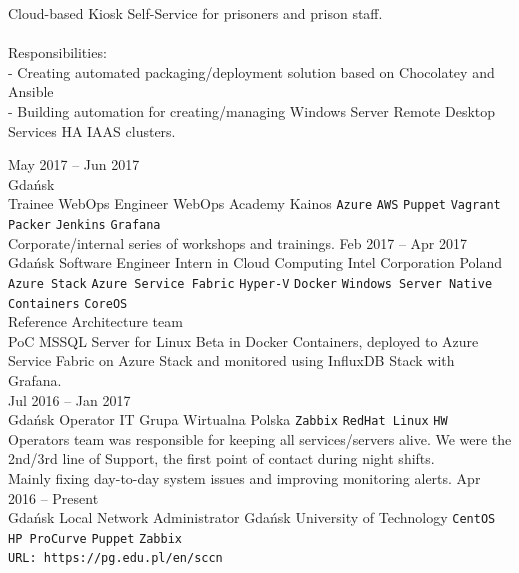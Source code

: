\documentclass[9pt]{style/developercv}
\begin{document}
\begin{entrylist}
{      Cloud-based Kiosk Self-Service for prisoners and prison staff. \\
      \\
      Responsibilities:\\
      - Creating automated packaging/deployment solution based on Chocolatey and Ansible\\
      - Building automation for creating/managing Windows Server Remote Desktop Services HA IAAS clusters.

		}
	\entry
    {May 2017 -- Jun 2017\\\footnotesize{Gdańsk}\\
    \footnotesize{Trainee WebOps Engineer}}
		{WebOps Academy}
		{Kainos}
		{
			\texttt{Azure}\slashsep
			\texttt{AWS}\slashsep
			\texttt{Puppet}\slashsep
			\texttt{Vagrant}\slashsep
			\texttt{Packer}\slashsep
			\texttt{Jenkins}\slashsep
			\texttt{Grafana}\\

      Corporate/internal series of workshops and trainings.
		}
	\entry
		{Feb 2017 -- Apr 2017\\\footnotesize{Gdańsk}}
		{Software Engineer Intern in Cloud Computing}
		{Intel Corporation Poland}
		{
      \texttt{Azure Stack}\slashsep
      \texttt{Azure Service Fabric}\slashsep
      \texttt{Hyper-V}\slashsep
      \texttt{Docker}\slashsep
			\texttt{Windows Server Native Containers}\slashsep
			\texttt{CoreOS}\\

      Reference Architecture team\\
      PoC MSSQL Server for Linux Beta in Docker Containers, deployed to Azure Service Fabric on Azure Stack and
      monitored using InfluxDB Stack with Grafana. \\
		}
	\entry
    {Jul 2016 -- Jan 2017\\\footnotesize{Gdańsk}}
		{Operator IT}
		{Grupa Wirtualna Polska}
		{
			\texttt{Zabbix}\slashsep
			\texttt{RedHat Linux}\slashsep
			\texttt{HW}\\

      Operators team was responsible for keeping all services/servers alive.
      We were the 2nd/3rd line of Support, the first point of contact during night shifts.\\
      Mainly fixing day-to-day system issues and improving monitoring alerts.
		}
	\entry
    {Apr 2016 -- Present\\\footnotesize{Gdańsk}}
    {Local Network Administrator}
    {Gdańsk University of Technology}
		{
			\texttt{CentOS}\slashsep
			\texttt{HP ProCurve}\slashsep
			\texttt{Puppet}\slashsep
			\texttt{Zabbix}\\
      \texttt{URL: https://pg.edu.pl/en/sccn}\\

}
\end{entrylist}
\end{document}
